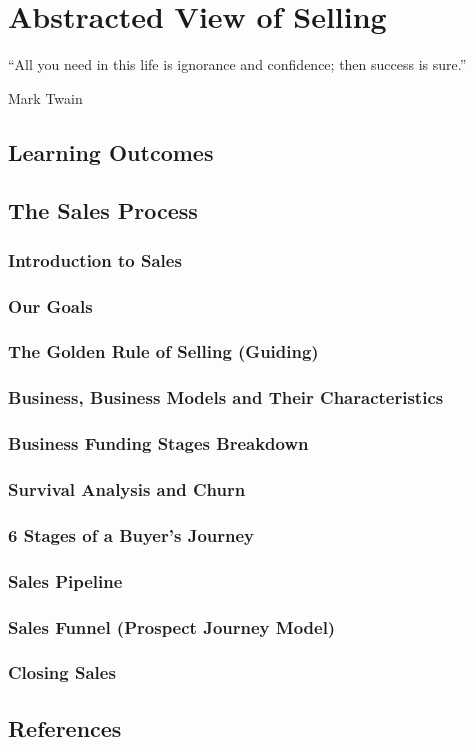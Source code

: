 \frenchspacing
\chapter{Abstracted View of Selling}
\epigraph{“All you need in this life is ignorance and confidence; then success is sure.”}{Mark Twain}

%
\section{Learning Outcomes}
%
\section{The Sales Process}
\subsection{Introduction to Sales}
\subsection{Our Goals}
\subsection{The Golden Rule of Selling (Guiding)}
\subsection{Business, Business Models and Their Characteristics}
\subsection{Business Funding Stages Breakdown}
\subsection{Survival Analysis and Churn}
\subsection{6 Stages of a Buyer's Journey}
\subsection{Sales Pipeline}
\subsection{Sales Funnel (Prospect Journey Model)}
\subsection{Closing Sales}

%
\section{References}